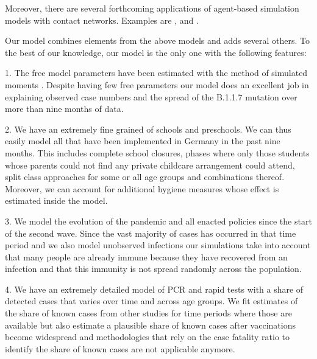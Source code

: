 Moreover, there are several forthcoming applications of agent-based simulation models with contact networks. Examples are
\citet{Basurto2020}, \citet{DelliGatti2020} and \citet{Mellacher2020}.

Our model combines elements from the above models and adds several others. To the best of
our knowledge, our model is the only one with the following features:

1. The free model parameters have been estimated with the method of simulated moments
   \citep{McFadden1989}. Despite having few free parameters our model does an excellent
   job in explaining observed case numbers and the spread of the B.1.1.7 mutation over
   more than nine months of data.

2. We have an extremely fine grained  of schools and
   preschools. We can thus easily model all 
   that have been implemented in Germany in the past nine months. This includes complete
   school closures, phases where only those students whose parents could not find any
   private childcare arrangement could attend, split class approaches for some or all age
   groups and combinations thereof. Moreover, we can account for additional hygiene
   measures whose effect is estimated inside the model.

3. We model the evolution of the pandemic and all enacted policies since the start of the
   second wave. Since the vast majority of cases has occurred in that time period and we
   also model unobserved infections our simulations take into account that many people
   are already immune because they have recovered from an infection and that this
   immunity is not spread randomly across the population.

4. We have an extremely detailed model of PCR and rapid tests with a share of detected
   cases that varies over time and across age groups. We fit estimates of the share of
   known cases from other studies for time periods where those are
   available but also estimate a plausible share of known
   cases after vaccinations become widespread and methodologies that rely on the case
   fatality ratio to identify the share of known cases are not applicable anymore.

